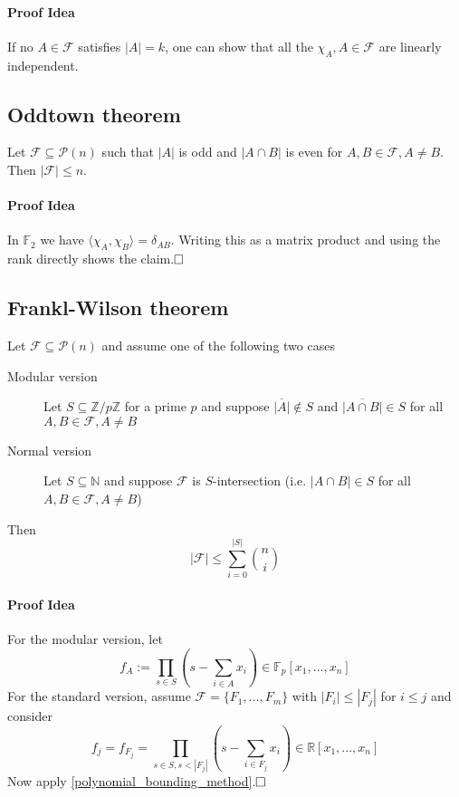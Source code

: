 \documentclass{scrartcl}
\newcommand{\R}{\mathbb{R}}
\newcommand{\N}{\mathbb{N}}
\newcommand{\Z}{\mathbb{Z}}
\begin{document}
\paragraph{Proof Idea} If no $A \in \mathcal{F}$ satisfies $|A| = k$, one can show that all the $\chi_A, A \in \mathcal{F}$ are linearly independent.

\subsection{Oddtown theorem}
Let $\mathcal{F} \subseteq \mathcal{P}(n)$ such that $|A|$ is odd and $|A \cap B|$ is even for $A, B \in \mathcal{F}, A \neq B$. Then $|\mathcal{F}| \leq n$.
\paragraph{Proof Idea} In $\mathbb{F}_2$ we have $\langle \chi_A, \chi_B \rangle = \delta_{AB}$. Writing this as a matrix product and using the rank directly shows the claim.$\hfill\square$

\subsection{Frankl-Wilson theorem}
Let $\mathcal{F} \subseteq \mathcal{P}(n)$ and assume one of the following two cases
\begin{description}
    \item[Modular version] Let $S \subseteq \Z/p\Z$ for a prime $p$ and suppose $\overline{|A|} \notin S$ and $\overline{|A \cap B|} \in S$ for all $A, B \in \mathcal{F}, A \neq B$
    \item[Normal version] Let $S \subseteq \N$ and suppose $\mathcal{F}$ is $S$-intersection (i.e. $|A \cap B| \in S$ for all $A, B \in \mathcal{F}, A \neq B$)
\end{description}
Then
\begin{equation*}
    |\mathcal{F}| \leq \sum_{i = 0}^{|S|} {n \choose i}
\end{equation*}
\paragraph{Proof Idea} For the modular version, let
\begin{equation*}
    f_A := \prod_{s \in S} (s - \sum_{i \in A} x_i) \in \mathbb{F}_p[x_1, ..., x_n]
\end{equation*}
For the standard version, assume $\mathcal{F} = \{ F_1, ..., F_m \}$ with $|F_i| \leq |F_j|$ for $i \leq j$ and consider
\begin{equation*}
    f_j = f_{F_j} = \prod_{s \in S, s < |F_j|} (s - \sum_{i \in F_j} x_i) \in \R[x_1, ..., x_n]
\end{equation*}
Now apply \ref{polynomial_bounding_method}.$\hfill\square$
\end{document}
